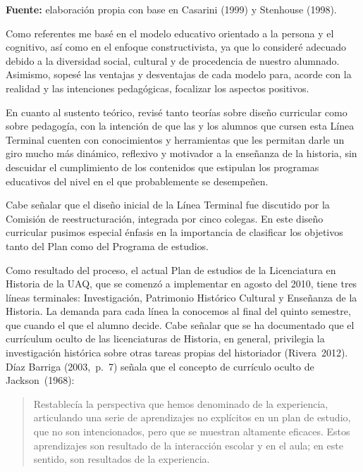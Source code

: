 {\footnotesize {\bfseries Fuente:} elaboración propia con base en Casarini (1999) y 
Stenhouse (1998).}
\newpage

Como referentes me basé en el modelo educativo orientado a la persona y  el cognitivo, así como en el enfoque constructivista, ya que lo consideré 
adecuado debido a la diversidad social, cultural y de procedencia de nuestro 
alumnado. Asimismo, sopesé las ventajas y desventajas de cada modelo 
para, acorde con la realidad y las intenciones pedagógicas, focalizar 
los aspectos positivos. 

En cuanto al sustento teórico, revisé tanto teorías sobre diseño 
curricular como sobre pedagogía, con la intención de que las y los 
alumnos que cursen esta Línea Terminal cuenten con conocimientos y 
herramientas que les permitan darle un giro mucho más dinámico, reflexivo 
y motivador a la enseñanza de la historia, sin descuidar el 
cumplimiento de los contenidos que estipulan los programas educativos 
del nivel en el que probablemente se desempeñen. 

Cabe señalar que el diseño inicial de la Línea Terminal fue discutido por la 
Comisión de reestructuración, integrada por cinco colegas. En este diseño curricular 
pusimos especial énfasis en la importancia de clasificar los objetivos tanto del Plan como 
del Programa de estudios. 

\enlargethispage{-1\baselineskip}
Como resultado del proceso, el actual Plan de estudios de  la 
Licenciatura en Historia de la UAQ, que se comenzó a implementar en 
agosto del 2010, tiene tres líneas terminales: Investigación, 
Patrimonio Histórico Cultural y Enseñanza de la Historia. La demanda 
para cada línea la conocemos al final del quinto semestre, que cuando el 
que el alumno decide. Cabe señalar que se ha documentado que el 
currículum oculto de las licenciaturas de Historia, en general, 
privilegia la investigación histórica sobre otras tareas propias del 
historiador (Rivera~2012). Díaz Barriga (2003,~p.~7) señala que el 
concepto de currículo oculto de \mbox{Jackson~(1968)}:
\newpage

\begin{quotation}
Restablecía la perspectiva que hemos denominado de 
la experiencia, articulando una serie de aprendizajes no explícitos en 
un plan de estudio, que no son intencionados, pero que se muestran 
altamente eficaces. Estos aprendizajes son resultado de la interacción 
escolar y en el aula; en este sentido, son resultados de la 
experiencia. 
\end{quotation}

